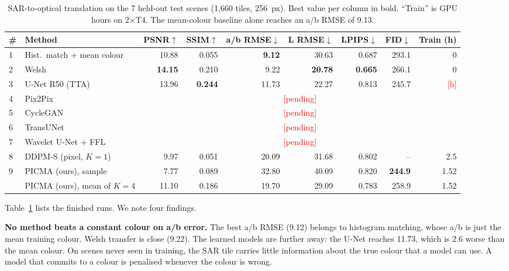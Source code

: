 \documentclass[conference]{IEEEtran}
\newcommand{\pend}[1]{\textcolor{red}{[#1]}}
\begin{document}
\begin{table}[t]
\centering
\caption{SAR-to-optical translation on the 7 held-out test scenes (1{,}660 tiles, 256~px).
Best value per column in bold. ``Train'' is GPU hours on 2$\times$T4. The mean-colour baseline
alone reaches an a/b RMSE of 9.13.}
\label{tab:results}
\begin{tabular}{llrrrrrrr}
\toprule
\# & Method & PSNR$\uparrow$ & SSIM$\uparrow$ & a/b RMSE$\downarrow$ & L RMSE$\downarrow$ &
LPIPS$\downarrow$ & FID$\downarrow$ & Train (h) \\
\midrule
1 & Hist.\ match + mean colour & 10.88 & 0.055 & \textbf{9.12} & 30.63 & 0.687 & 293.1 & 0 \\
2 & Welsh~\cite{welsh2002transferring} & \textbf{14.15} & 0.210 & 9.22 & \textbf{20.78} & \textbf{0.665} & 266.1 & 0 \\
3 & U-Net R50 (TTA) & 13.96 & \textbf{0.244} & 11.73 & 22.27 & 0.813 & 245.7 & \pend{h} \\
4 & Pix2Pix~\cite{isola2017pix2pix} & \multicolumn{7}{c}{\pend{pending}} \\
5 & CycleGAN~\cite{zhu2017cyclegan} & \multicolumn{7}{c}{\pend{pending}} \\
6 & TransUNet~\cite{chen2021transunet} & \multicolumn{7}{c}{\pend{pending}} \\
7 & Wavelet U-Net + FFL & \multicolumn{7}{c}{\pend{pending}} \\
8 & DDPM-S (pixel, $K{=}1$) & 9.97 & 0.051 & 20.09 & 31.68 & 0.802 & -- & 2.5 \\
\midrule
9 & PICMA (ours), sample & 7.77 & 0.089 & 32.80 & 40.09 & 0.820 & \textbf{244.9} & 1.52 \\
  & PICMA (ours), mean of $K{=}4$ & 11.10 & 0.186 & 19.70 & 29.09 & 0.783 & 258.9 & 1.52 \\
\bottomrule
\end{tabular}
\end{table}

Table~\ref{tab:results} lists the finished runs. We note four findings.

\textbf{No method beats a constant colour on a/b error.} The best a/b RMSE (9.12) belongs to
histogram matching, whose a/b is just the mean training colour. Welsh transfer is close
(9.22). The learned models are further away: the U-Net reaches 11.73, which is 2.6 worse
than the mean colour. On scenes never seen in training, the SAR tile carries little
information about the true colour that a model can use. A model that commits to a colour
is penalised whenever the colour is wrong.
\end{document}
